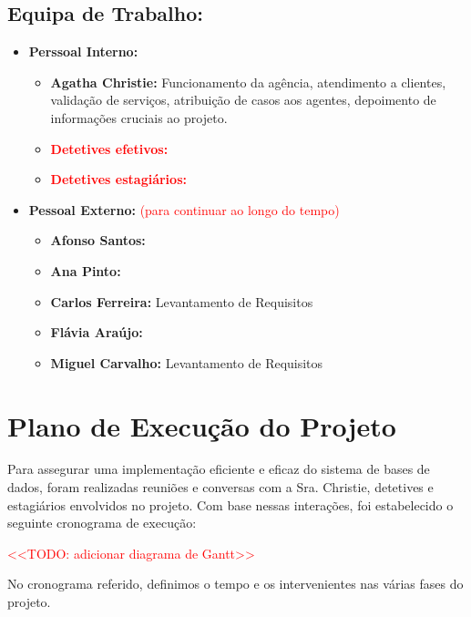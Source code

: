 \documentclass[a4paper,12pt]{scrreprt}
\begin{document}
        \subsection{Equipa de Trabalho:}
            \begin{itemize}
                \item \textbf{Perssoal Interno:}
                \begin{itemize}
                    \item \textbf{Agatha Christie:} Funcionamento da agência, atendimento a clientes,
                        validação de serviços, atribuição de casos aos agentes, depoimento de informações
                        cruciais ao projeto.
                    \item \textcolor{red}{\textbf{Detetives efetivos:}}
                    \item \textcolor{red}{\textbf{Detetives estagiários:}}
                \end{itemize}
            \item \textbf{Pessoal Externo:} \textcolor{red}{(para continuar ao longo do tempo)}
                \begin{itemize}
                    \item \textbf{Afonso Santos:}
                    \item \textbf{Ana Pinto:}
                    \item \textbf{Carlos Ferreira:} Levantamento de Requisitos
                    \item \textbf{Flávia Araújo:}
                    \item \textbf{Miguel Carvalho:} Levantamento de Requisitos
                \end{itemize}
            \end{itemize}

    \section{Plano de Execução do Projeto}
        \par Para assegurar uma implementação eficiente e eficaz do sistema de bases de dados, foram realizadas reuniões e conversas com a Sra. Christie, detetives e estagiários envolvidos no projeto. Com base nessas interações, foi estabelecido o seguinte cronograma de execução:
        \par
         \textcolor{red}{
            <<TODO: adicionar diagrama de Gantt>>
        }
        \par No cronograma referido, definimos o tempo e os intervenientes nas           várias fases do projeto.
\end{document}
